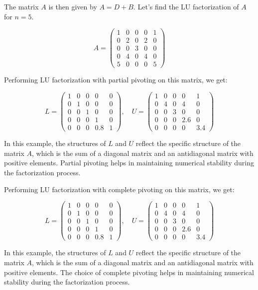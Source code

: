 \documentclass{article}
\begin{document}
The matrix \(A\) is then given by \(A = D + B\). Let's find the LU factorization of \(A\) for \(n = 5\).

\[
A = \begin{pmatrix} 1 & 0 & 0 & 0 & 1 \\ 0 & 2 & 0 & 2 & 0 \\ 0 & 0 & 3 & 0 & 0 \\ 0 & 4 & 0 & 4 & 0 \\ 5 & 0 & 0 & 0 & 5 \end{pmatrix}
\]

Performing LU factorization with partial pivoting on this matrix, we get:

\[
L = \begin{pmatrix} 1 & 0 & 0 & 0 & 0 \\ 0 & 1 & 0 & 0 & 0 \\ 0 & 0 & 1 & 0 & 0 \\ 0 & 0 & 0 & 1 & 0 \\ 0 & 0 & 0 & 0.8 & 1 \end{pmatrix}, \quad U = \begin{pmatrix} 1 & 0 & 0 & 0 & 1 \\ 0 & 4 & 0 & 4 & 0 \\ 0 & 0 & 3 & 0 & 0 \\ 0 & 0 & 0 & 2.6 & 0 \\ 0 & 0 & 0 & 0 & 3.4 \end{pmatrix}
\]

In this example, the structures of \(L\) and \(U\) reflect the specific structure of the matrix \(A\), which is the sum of a diagonal matrix and an antidiagonal matrix with positive elements. Partial pivoting helps in maintaining numerical stability during the factorization process.

Performing LU factorization with complete pivoting on this matrix, we get:

\[
L = \begin{pmatrix} 1 & 0 & 0 & 0 & 0 \\ 0 & 1 & 0 & 0 & 0 \\ 0 & 0 & 1 & 0 & 0 \\ 0 & 0 & 0 & 1 & 0 \\ 0 & 0 & 0 & 0.8 & 1 \end{pmatrix}, \quad U = \begin{pmatrix} 1 & 0 & 0 & 0 & 1 \\ 0 & 4 & 0 & 4 & 0 \\ 0 & 0 & 3 & 0 & 0 \\ 0 & 0 & 0 & 2.6 & 0 \\ 0 & 0 & 0 & 0 & 3.4 \end{pmatrix}
\]

In this example, the structures of \(L\) and \(U\) reflect the specific structure of the matrix \(A\), which is the sum of a diagonal matrix and an antidiagonal matrix with positive elements. The choice of complete pivoting helps in maintaining numerical stability during the factorization process.
\end{document}
